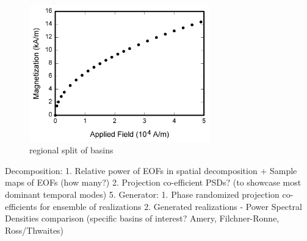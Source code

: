 \begin{figure}
\centerline{\includegraphics[width=18.5pc]{fig/fig1.png}}
\caption{regional split of basins}
\end{figure}

Decomposition:
	1. Relative power of EOFs in spatial decomposition + Sample maps of EOFs (how many?)
	2. Projection co-efficient PSDs? (to showcase most dominant temporal modes) 
5. Generator:
	1. Phase randomized projection co-efficients for ensemble of realizations
	2. Generated realizations - Power Spectral Densities comparison (specific basins of interest? Amery, Filchner-Ronne, Ross/Thwaites)